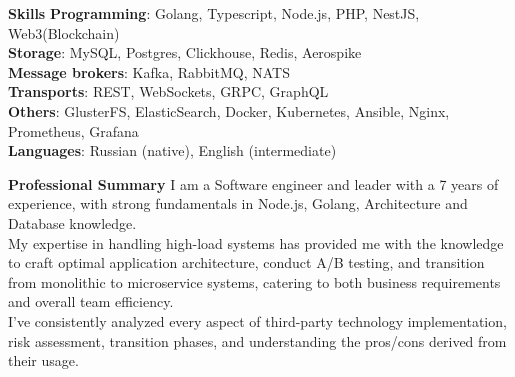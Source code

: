 \documentclass{resume} %
\begin{document}
\begin{rSection}{\textbf{Skills}}
       \textbf{Programming}: Golang, Typescript, Node.js, PHP, NestJS, Web3(Blockchain)
       \\ \textbf{Storage}: MySQL, Postgres, Clickhouse, Redis, Aerospike
       \\ \textbf{Message brokers}: Kafka, RabbitMQ, NATS
       \\ \textbf{Transports}: REST, WebSockets, GRPC, GraphQL
       \\ \textbf{Others}: GlusterFS, ElasticSearch, Docker, Kubernetes, Ansible, Nginx, Prometheus, Grafana
       \\ \textbf{Languages}: Russian (native), English (intermediate)
\end{rSection}

\begin{rSection}{\textbf{Professional Summary}}
{ I am a Software engineer and leader with a 7 years of experience, with strong fundamentals in Node.js, Golang, Architecture and Database
knowledge.
\\ My expertise in handling high-load systems has provided me with the knowledge to craft optimal application architecture, conduct A/B testing, and transition from monolithic to microservice systems, catering to both business requirements and overall team efficiency.
\\ I've consistently analyzed every aspect of third-party technology implementation, risk assessment, transition phases, and understanding the pros/cons derived from their usage.
}

\end{rSection}

\end{document}
